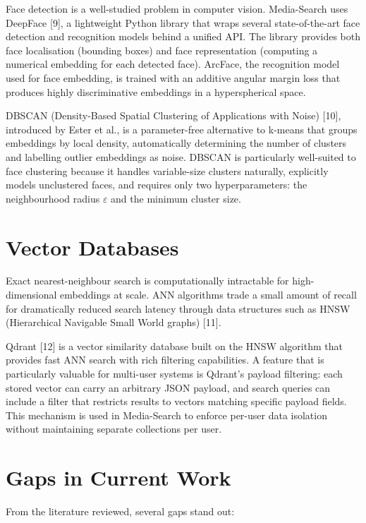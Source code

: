 \documentclass[12pt,a4paper,oneside]{report}
\begin{document}
Face detection is a well-studied problem in computer vision. Media-Search uses DeepFace [9], a lightweight Python library that wraps several state-of-the-art face detection and recognition models behind a unified API. The library provides both face localisation (bounding boxes) and face representation (computing a numerical embedding for each detected face). ArcFace, the recognition model used for face embedding, is trained with an additive angular margin loss that produces highly discriminative embeddings in a hyperspherical space.

DBSCAN (Density-Based Spatial Clustering of Applications with Noise) [10], introduced by Ester et al., is a parameter-free alternative to k-means that groups embeddings by local density, automatically determining the number of clusters and labelling outlier embeddings as noise. DBSCAN is particularly well-suited to face clustering because it handles variable-size clusters naturally, explicitly models unclustered faces, and requires only two hyperparameters: the neighbourhood radius $\varepsilon$ and the minimum cluster size.

\section{Vector Databases}

Exact nearest-neighbour search is computationally intractable for high-dimensional embeddings at scale. ANN algorithms trade a small amount of recall for dramatically reduced search latency through data structures such as HNSW (Hierarchical Navigable Small World graphs) [11].

Qdrant [12] is a vector similarity database built on the HNSW algorithm that provides fast ANN search with rich filtering capabilities. A feature that is particularly valuable for multi-user systems is Qdrant's payload filtering: each stored vector can carry an arbitrary JSON payload, and search queries can include a filter that restricts results to vectors matching specific payload fields. This mechanism is used in Media-Search to enforce per-user data isolation without maintaining separate collections per user.

\section{Gaps in Current Work}

From the literature reviewed, several gaps stand out:
\end{document}
